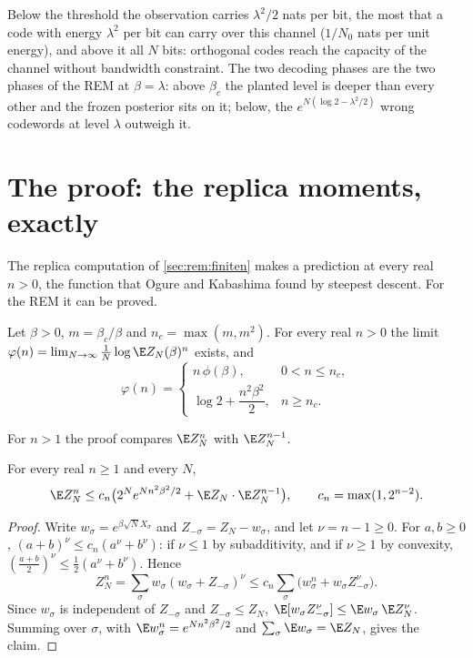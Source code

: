 \begin{refsection}
Below the threshold the observation carries $\lambda^2/2$ nats per bit, the most that a code with energy $\lambda^2$ per bit can carry over this channel ($1/N_0$ nats per unit energy), and above it all $N$ bits: orthogonal codes reach the capacity of the channel without bandwidth constraint. The two decoding phases are the two phases of the REM at $\beta=\lambda$: above $\beta_c$ the planted level is deeper than every other and the frozen posterior sits on it; below, the $e^{N(\log2-\lambda^2/2)}$ wrong codewords at level $\lambda$ outweigh it.

\section{The proof: the replica moments, exactly}\label{sec:rem:moments}

The replica computation of \cref{sec:rem:finiten} makes a prediction at every real $n>0$, the function that Ogure and Kabashima found by steepest descent. For the REM it can be proved.

\begin{theorem}\label{thm:rem:moments}
Let $\beta>0$, $m=\beta_c/\beta$ and $n_c=\max(m,m^2)$. For every real $n>0$ the limit $\varphi(n)=\lim_{N\to\infty}\frac1N\log\E Z_N(\beta)^n$ exists, and
\begin{equation}\label{eq:rem:moments}
\varphi(n)=\begin{cases}n\,\phi(\beta),&0<n\le n_c,\\[0.6ex] \log2+\dfrac{n^2\beta^2}2,&n\ge n_c.\end{cases}
\end{equation}
\end{theorem}

For $n>1$ the proof compares $\E Z_N^n$ with $\E Z_N^{n-1}$.

\begin{lemma}\label{lem:rem:recursion}
For every real $n\ge1$ and every $N$,
\[
\E Z_N^n\le c_n\bigl(2^Ne^{Nn^2\beta^2/2}+\E Z_N\cdot\E Z_N^{n-1}\bigr),\qquad c_n=\max(1,2^{n-2}).
\]
\end{lemma}

\begin{proof}
Write $w_\sigma=e^{\beta\sqrt NX_\sigma}$ and $Z_{-\sigma}=Z_N-w_\sigma$, and let $\nu=n-1\ge0$. For $a,b\ge0$, $(a+b)^\nu\le c_n(a^\nu+b^\nu)$: if $\nu\le1$ by subadditivity, and if $\nu\ge1$ by convexity, $(\frac{a+b}2)^\nu\le\frac12(a^\nu+b^\nu)$. Hence
\[
Z_N^n=\sum_\sigma w_\sigma(w_\sigma+Z_{-\sigma})^\nu\le c_n\sum_\sigma\bigl(w_\sigma^n+w_\sigma Z_{-\sigma}^\nu\bigr).
\]
Since $w_\sigma$ is independent of $Z_{-\sigma}$ and $Z_{-\sigma}\le Z_N$, $\E[w_\sigma Z_{-\sigma}^\nu]\le\E w_\sigma\,\E Z_N^\nu$. Summing over $\sigma$, with $\E w_\sigma^n=e^{Nn^2\beta^2/2}$ and $\sum_\sigma\E w_\sigma=\E Z_N$, gives the claim.
\end{proof}


\end{refsection}
